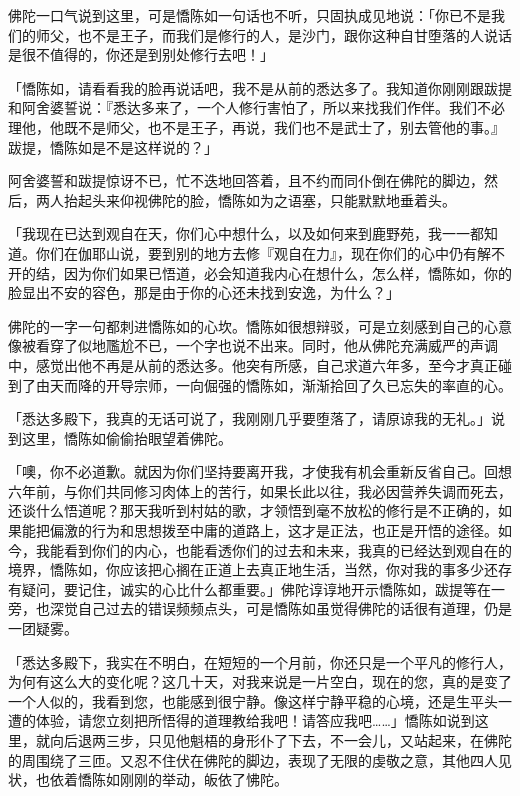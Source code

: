 \documentclass[12pt,twoside,openany]{book}
\begin{document}
佛陀一口气说到这里，可是憍陈如一句话也不听，只固执成见地说：「你已不是我们的师父，也不是王子，而我们是修行的人，是沙门，跟你这种自甘堕落的人说话是很不值得的，你还是到别处修行去吧！」

「憍陈如，请看看我的脸再说话吧，我不是从前的悉达多了。我知道你刚刚跟跋提和阿舍婆誓说：『悉达多来了，一个人修行害怕了，所以来找我们作伴。我们不必理他，他既不是师父，也不是王子，再说，我们也不是武士了，别去管他的事。』跋提，憍陈如是不是这样说的？」

阿舍婆誓和跋提惊讶不已，忙不迭地回答着，且不约而同仆倒在佛陀的脚边，然后，两人抬起头来仰视佛陀的脸，憍陈如为之语塞，只能默默地垂着头。

「我现在已达到观自在天，你们心中想什么，以及如何来到鹿野苑，我一一都知道。你们在伽耶山说，要到别的地方去修『观自在力』，现在你们的心中仍有解不开的结，因为你们如果已悟道，必会知道我内心在想什么，怎么样，憍陈如，你的脸显出不安的容色，那是由于你的心还未找到安逸，为什么？」

佛陀的一字一句都刺进憍陈如的心坎。憍陈如很想辩驳，可是立刻感到自己的心意像被看穿了似地尶尬不已，一个字也说不出来。同时，他从佛陀充满威严的声调中，感觉出他不再是从前的悉达多。他突有所感，自己求道六年多，至今才真正碰到了由天而降的开导宗师，一向倔强的憍陈如，渐渐拾回了久已忘失的率直的心。

「悉达多殿下，我真的无话可说了，我刚刚几乎要堕落了，请原谅我的无礼。」说到这里，憍陈如偷偷抬眼望着佛陀。

「噢，你不必道歉。就因为你们坚持要离开我，才使我有机会重新反省自己。回想六年前，与你们共同修习肉体上的苦行，如果长此以往，我必因营养失调而死去，还谈什么悟道呢？那天我听到村姑的歌，才领悟到毫不放松的修行是不正确的，如果能把偏激的行为和思想拨至中庸的道路上，这才是正法，也正是开悟的途径。如今，我能看到你们的内心，也能看透你们的过去和未来，我真的已经达到观自在的境界，憍陈如，你应该把心搁在正道上去真正地生活，当然，你对我的事多少还存有疑问，要记住，诚实的心比什么都重要。」佛陀谆谆地开示憍陈如，跋提等在一旁，也深觉自己过去的错误频频点头，可是憍陈如虽觉得佛陀的话很有道理，仍是一团疑雾。

「悉达多殿下，我实在不明白，在短短的一个月前，你还只是一个平凡的修行人，为何有这么大的变化呢？这几十天，对我来说是一片空白，现在的您，真的是变了一个人似的，我看到您，也能感到很宁静。像这样宁静平稳的心境，还是生平头一遭的体验，请您立刻把所悟得的道理教给我吧！请答应我吧……」憍陈如说到这里，就向后退两三步，只见他魁梧的身形仆了下去，不一会儿，又站起来，在佛陀的周围绕了三匝。又忍不住伏在佛陀的脚边，表现了无限的虔敬之意，其他四人见状，也依着憍陈如刚刚的举动，皈依了怫陀。
\end{document}
